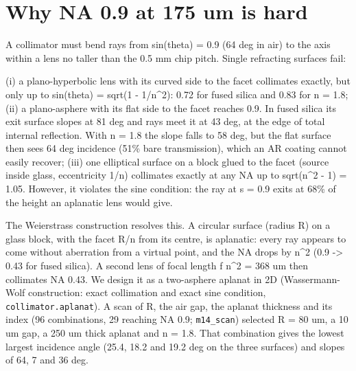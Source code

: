 \hypertarget{2-why-na-09-at-175-um-is-hard}{%
\section{Why NA 0.9 at 175 um is
hard}\label{collimator-2-why-na-09-at-175-um-is-hard}}

A collimator must bend rays from sin(theta) = 0.9 (64 deg in air) to the
axis within a lens no taller than the 0.5 mm chip pitch. Single
refracting surfaces fail:

(i) a plano-hyperbolic lens with its curved side to the facet collimates
exactly, but only up to sin(theta) = sqrt(1 - 1/n\^{}2): 0.72 for fused
silica and 0.83 for n = 1.8; (ii) a plano-asphere with its flat side to
the facet reaches 0.9. In fused silica its exit surface slopes at 81 deg
and rays meet it at 43 deg, at the edge of total internal reflection.
With n = 1.8 the slope falls to 58 deg, but the flat surface then sees
64 deg incidence (51\% bare transmission), which an AR coating cannot
easily recover; (iii) one elliptical surface on a block glued to the
facet (source inside glass, eccentricity 1/n) collimates exactly at any
NA up to sqrt(n\^{}2 - 1) = 1.05. However, it violates the sine
condition: the ray at s = 0.9 exits at 68\% of the height an aplanatic
lens would give.

The Weierstrass construction resolves this. A circular surface (radius
R) on a glass block, with the facet R/n from its centre, is aplanatic:
every ray appears to come without aberration from a virtual point, and
the NA drops by n\^{}2 (0.9 -\textgreater{} 0.43 for fused silica). A
second lens of focal length f n\^{}2 = 368 um then collimates NA 0.43.
We design it as a two-asphere aplanat in 2D (Wassermann-Wolf
construction: exact collimation and exact sine condition,
\texttt{collimator.aplanat}). A scan of R, the air gap, the aplanat
thickness and its index (96 combinations, 29 reaching NA 0.9;
\texttt{m14\_scan}) selected R = 80 um, a 10 um gap, a 250 um thick
aplanat and n = 1.8. That combination gives the lowest largest incidence
angle (25.4, 18.2 and 19.2 deg on the three surfaces) and slopes of 64,
7 and 36 deg.

